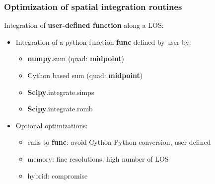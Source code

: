 \documentclass[10pt]{beamer}
\begin{document}
\begin{frame}
\frametitle{Optimization of spatial integration routines}

Integration of \textbf{user-defined function} along a LOS:
	\begin{itemize}
	\item Integration of a python function \textbf{func} defined by user by:
		\begin{itemize}
		\item \textbf{numpy}.sum (quad: \textbf{midpoint})
		\item Cython based sum (quad: \textbf{midpoint})
		\item \textbf{Scipy}.integrate.simps
		\item \textbf{Scipy}.integrate.romb
		\end{itemize}
	\item Optional optimizations:
		\begin{itemize}
		\item calls to \textbf{func}: avoid Cython-Python conversion, user-defined
		\item memory: fine resolutions, high number of LOS
		\item hybrid: compromise
		\end{itemize}
	\end{itemize}

\end{frame}


%
%
%
%
%
\end{document}
